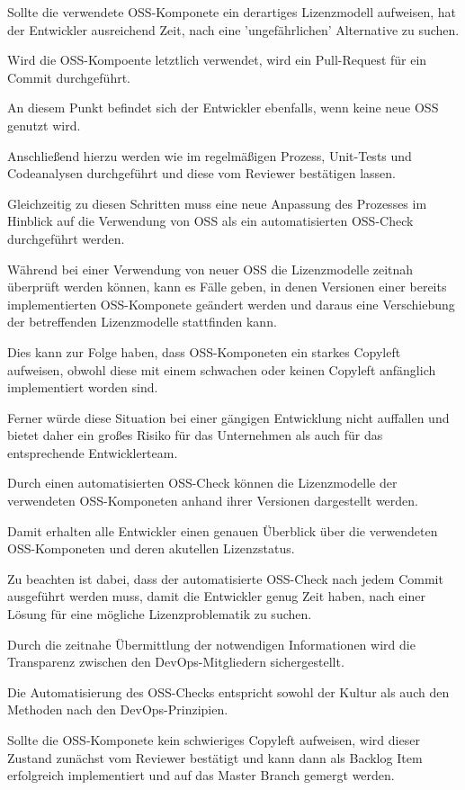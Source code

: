 Sollte die verwendete OSS-Komponete ein derartiges Lizenzmodell aufweisen, hat der Entwickler ausreichend Zeit, nach eine 'ungefährlichen' Alternative zu suchen.  

Wird die OSS-Kompoente letztlich verwendet, wird ein Pull-Request für ein Commit durchgeführt. 

An diesem Punkt befindet sich der Entwickler ebenfalls, wenn keine neue OSS genutzt wird. 

Anschließend hierzu werden wie im regelmäßigen Prozess, Unit-Tests und Codeanalysen durchgeführt und diese vom Reviewer bestätigen lassen.

Gleichzeitig zu diesen Schritten muss eine neue Anpassung des Prozesses im Hinblick auf die Verwendung von OSS als ein automatisierten OSS-Check durchgeführt werden.

Während bei einer Verwendung von neuer OSS die Lizenzmodelle zeitnah überprüft werden können, kann es Fälle geben, in denen Versionen einer bereits implementierten OSS-Komponete geändert werden und daraus eine Verschiebung der betreffenden Lizenzmodelle stattfinden kann. 

Dies kann zur Folge haben, dass OSS-Komponeten ein starkes Copyleft aufweisen, obwohl diese mit einem schwachen oder keinen Copyleft anfänglich implementiert worden sind. 

Ferner würde diese Situation bei einer gängigen Entwicklung nicht auffallen und bietet daher ein großes Risiko für das Unternehmen als auch für das entsprechende Entwicklerteam. 

Durch einen automatisierten OSS-Check können die Lizenzmodelle der verwendeten OSS-Komponeten anhand ihrer Versionen dargestellt werden. 

Damit erhalten alle Entwickler einen genauen Überblick über die verwendeten OSS-Komponeten und deren akutellen Lizenzstatus. 

Zu beachten ist dabei, dass der automatisierte OSS-Check nach jedem Commit ausgeführt werden muss, damit die Entwickler genug Zeit haben, nach einer Lösung für eine mögliche Lizenzproblematik zu suchen.

Durch die zeitnahe Übermittlung der notwendigen Informationen wird die Transparenz zwischen den DevOps-Mitgliedern sichergestellt. 

Die Automatisierung des OSS-Checks entspricht sowohl der Kultur als auch den Methoden nach den DevOps-Prinzipien.

Sollte die OSS-Komponete kein schwieriges Copyleft aufweisen, wird dieser Zustand zunächst vom Reviewer bestätigt und kann dann als Backlog Item erfolgreich implementiert und auf das Master Branch gemergt werden. 

